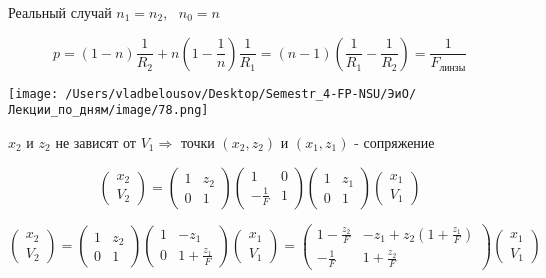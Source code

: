 \documentclass[12pt, a4paper]{report}
\begin{document}
Реальный случай \( n_1 = n_2 , \text{ } n_0 = n \) 

\[  p = (1 - n ) \frac{1}{R_2} + n \left( 1 - \frac{1}{n }  \right) \frac{1}{R_1} =   (n -1 ) \left(  \frac{1}{R_1 } - \frac{1}{R_2 }   \right) = \frac{1}{F_{\text{линзы} } }  \] 

\begin{center}
    \texttt{[image: /Users/vladbelousov/Desktop/Semestr\_4-FP-NSU/ЭиО/Лекции\_по\_дням/image/78.png]}
\end{center} 

\( x_2    \) и \( z_2 \) не зависят от \( V_1 \Rightarrow  \) точки \( (x_2 ,z_2 ) \) и \( (x_1 ,z_1 ) \) - сопряжение 

\[ \begin{pmatrix}
x_2 \\
V_2 
\end{pmatrix} =   
\begin{pmatrix}
    1  & z_2  \\
    0  & 1 
\end{pmatrix}
\begin{pmatrix}
    1  & 0  \\
    -\frac{1}{F}   & 1 
\end{pmatrix}
\begin{pmatrix}
    1  & z_1  \\
    0  & 1 
\end{pmatrix}
\begin{pmatrix}
    x_1 \\
    V_1
\end{pmatrix}
\] 

\[ \begin{pmatrix}
    x_2 \\
    V_2 
\end{pmatrix} =
\begin{pmatrix}
    1  & z_2  \\
    0  & 1 
\end{pmatrix}
\begin{pmatrix}
    1  & -z_1  \\
    0  & 1+\frac{z_1}{F}  
\end{pmatrix} 
\begin{pmatrix}
    x_1 \\
    V_1
\end{pmatrix}=
\begin{pmatrix}
    1- \frac{z_2}{F }   & -z_1 + z_2   \left( 1 + \frac{z_1}{F}  \right)\\
    - \frac{1}{F }  & 1+ \frac{z_2}{F}  
\end{pmatrix}
\begin{pmatrix}
    x_1 \\
    V_1
\end{pmatrix}
\] 
\end{document}
